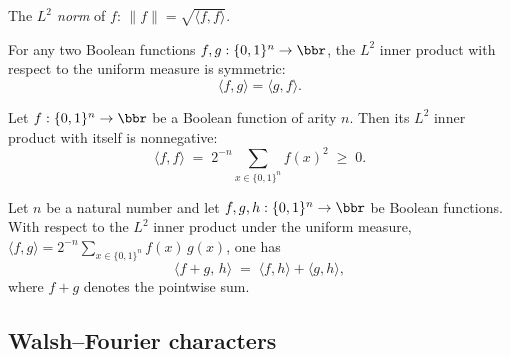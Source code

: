 \begin{definition}[$L^2$ norm]
\label{BooleanAnalysis.l2Norm}
\leanok
{}
The \emph{$L^2$ norm} of $f$: $\|f\| = \sqrt{\langle f,f\rangle}$.
\end{definition}

\begin{lemma}
\label{BooleanAnalysis.innerProduct_comm}
\leanok
{}
For any two Boolean functions $f, g : \{0,1\}^n \to \bbr$, the $L^2$ inner product with
respect to the uniform measure is symmetric:
\[
  \langle f, g\rangle = \langle g, f\rangle.
\]
\end{lemma}

\begin{lemma}
\label{BooleanAnalysis.innerProduct_self_nonneg}
\leanok
{}
Let $f : \{0,1\}^n \to \bbr$ be a Boolean function of arity $n$. Then its $L^2$ inner
product with itself is nonnegative:
\[
  \langle f, f\rangle \;=\; 2^{-n}\sum_{x\in\{0,1\}^n} f(x)^2 \;\ge\; 0.
\]
\end{lemma}

\begin{lemma}
\label{BooleanAnalysis.innerProduct_add_left}
\leanok
{}
Let $n$ be a natural number and let $f, g, h : \{0,1\}^n \to \bbr$ be Boolean functions.
With respect to the $L^2$ inner product under the uniform measure, $\langle f, g\rangle
= 2^{-n}\sum_{x\in\{0,1\}^n} f(x)\,g(x)$, one has
\[
  \langle f + g,\, h\rangle \;=\; \langle f, h\rangle + \langle g, h\rangle,
\]
where $f + g$ denotes the pointwise sum.
\end{lemma}

\subsection{Walsh--Fourier characters}

